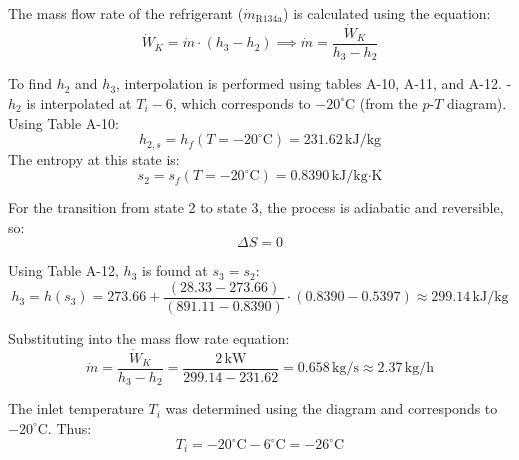 The mass flow rate of the refrigerant (\(\dot{m}_{\text{R134a}}\)) is calculated using the equation:  
\[
\dot{W}_K = \dot{m} \cdot (h_3 - h_2) \implies \dot{m} = \frac{\dot{W}_K}{h_3 - h_2}
\]  

To find \(h_2\) and \(h_3\), interpolation is performed using tables A-10, A-11, and A-12.  
- \(h_2\) is interpolated at \(T_i - 6\), which corresponds to \(-20^\circ\text{C}\) (from the \(p\)-\(T\) diagram). Using Table A-10:  
\[
h_{2,s} = h_f(T = -20^\circ\text{C}) = 231.62 \, \text{kJ/kg}
\]  
The entropy at this state is:  
\[
s_2 = s_f(T = -20^\circ\text{C}) = 0.8390 \, \text{kJ/kg·K}
\]  

For the transition from state 2 to state 3, the process is adiabatic and reversible, so:  
\[
\Delta S = 0
\]  

Using Table A-12, \(h_3\) is found at \(s_3 = s_2\):  
\[
h_3 = h(s_3) = 273.66 + \frac{(28.33 - 273.66)}{(891.11 - 0.8390)} \cdot (0.8390 - 0.5397) \approx 299.14 \, \text{kJ/kg}
\]  

Substituting into the mass flow rate equation:  
\[
\dot{m} = \frac{\dot{W}_K}{h_3 - h_2} = \frac{2 \, \text{kW}}{299.14 - 231.62} = 0.658 \, \text{kg/s} \approx 2.37 \, \text{kg/h}
\]  

The inlet temperature \(T_i\) was determined using the diagram and corresponds to \(-20^\circ\text{C}\). Thus:  
\[
T_i = -20^\circ\text{C} - 6^\circ\text{C} = -26^\circ\text{C}
\]